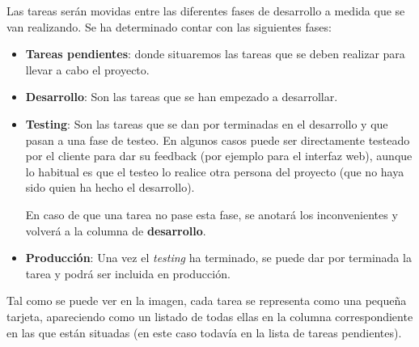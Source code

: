 \documentclass{\ClassPath/viu-tfm-template}
\begin{document}
Las tareas serán movidas entre las diferentes fases de desarrollo a medida que se van realizando. Se ha determinado contar con las siguientes fases:


\begin{minipage}{0.60\linewidth}
    \begin{itemize}
        \item \textbf{Tareas pendientes}: donde situaremos las tareas que se deben realizar para llevar a cabo el proyecto.
        \item \textbf{Desarrollo}: Son las tareas que se han empezado a desarrollar.
        \item \textbf{Testing}: Son las tareas que se dan por terminadas en el desarrollo y que pasan a una fase de testeo. En algunos casos puede ser directamente testeado por el cliente para dar su feedback (por ejemplo para el interfaz web), aunque lo habitual es que el testeo lo realice otra persona del proyecto (que no haya sido quien ha hecho el desarrollo).

        En caso de que una tarea no pase esta fase, se anotará los inconvenientes y volverá a la columna de \textbf{desarrollo}.
        \item \textbf{Producción}: Una vez el \textit{testing} ha terminado, se puede dar por terminada la tarea y podrá ser incluida en producción.
    \end{itemize}

    Tal como se puede ver en la imagen, cada tarea se representa como una pequeña tarjeta, apareciendo como un listado de todas ellas en la columna correspondiente en las que están situadas (en este caso todavía en la lista de tareas pendientes).
\end{minipage}
\hfill
\end{document}
